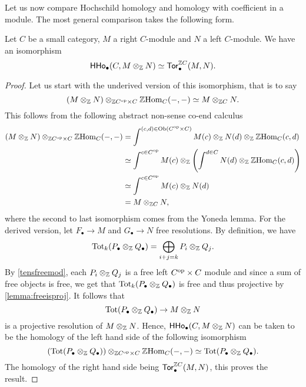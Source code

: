 \documentclass{amsart}
\newcommand{\HHo}{\mathsf{HHo}}
\newcommand{\Tot}{\mathrm{Tot}}
\renewcommand{\homset}[3]{\mathrm{Hom}_{#1}(#2,#3)}
\begin{document}
Let us now compare Hochschild homology and homology with coefficient in
a module. The most general comparison takes the following form.
\begin{proposition}
  Let $C$ be a small category, $M$ a right $C$\nbd-module and $N$ a
  left $C$\nbd-module. We have an isomorphism
  \[
    \HHo_{\bullet}(C,M\tens{\Z}N)\simeq \Tor{\Z C}{\bullet}(M,N).
  \]
\end{proposition}
\begin{proof}
  Let us start with the underived version of this isomorphism, that is
  to say
  \[
    (M\tens{\Z}N)\tens{\Z C^{\op}\times C}\Z\homset{C}{-}{-} \simeq M\tens{\Z C} N.
  \]
  This follows from the following abstract non-sense co-end calculus
  \[
    \begin{aligned}
     (M\tens{\Z}N)\tens{\Z C^{\op}\times C}\Z\homset{C}{-}{-} &=
                                                                \int^{(c,d)\in
                                                                \Ob(C^{\op}\times
                                                                C)}M(c)\tens{\Z}N(d)\tens{\Z}\Z\homset{C}{c}{d}\\ 
      &\simeq\int^{c \in C^{\op}}M(c)\tens{\Z}\left(\int^{d \in
        C}N(d)\tens{\Z}\Z\homset{C}{c}{d}\right)\\
                                                              &\simeq\int^{c\in C^{\op}}M(c)\tens{\Z}N(d)\\
      &=M\tens{\Z C}N,
    \end{aligned}
  \]
  where the second to last isomorphism comes from the Yoneda
  lemma. For the derived version, let $F_{\bullet} \to M$ and
  $G_{\bullet} \to N$ free resolutions. By definition, we have
  \[
    \Tot_k(P_{\bullet}\tens{\Z}Q_{\bullet})=\bigoplus_{i+j=k}P_i\tens{\Z}Q_j.
  \]
  By \cref{tensfreemod}, each $P_i\otimes_{\mathbb Z}Q_j$ is a free left
  $C^{{\mathrm{op}}}\times C$ module and since a sum of free objects is
  free, we get that
  $\Tot_k(P_{\bullet}\tens{\Z}Q_{\bullet})$ is free and thus
  projective by \cref{lemma:freeisproj}. It follows that
  \[
    \Tot(P_{\bullet}\tens{\Z}Q_{\bullet}) \to M\tens{\Z}N
  \]
  is a projective resolution of $M\otimes_{\mathbb Z}N$. Hence,
  $\HHo_{\bullet}(C,M\tens{\Z}N)$ can be taken to be the homology of
  the left hand side of the following isomorphism
  \[
    \left(\Tot(P_{\bullet}\tens{\Z}Q_{\bullet})\right)\tens{\Z C^{\op}\times C}\Z
    \homset{C}{-}{-}\simeq \Tot(P_{\bullet}\tens{\Z}Q_{\bullet}).
  \]
  The homology of the right hand side being $\mathsf{Tor}^{\mathbb Z C}_{\bullet}(M,N)$,
  this proves the result.
\end{proof}
\end{document}
